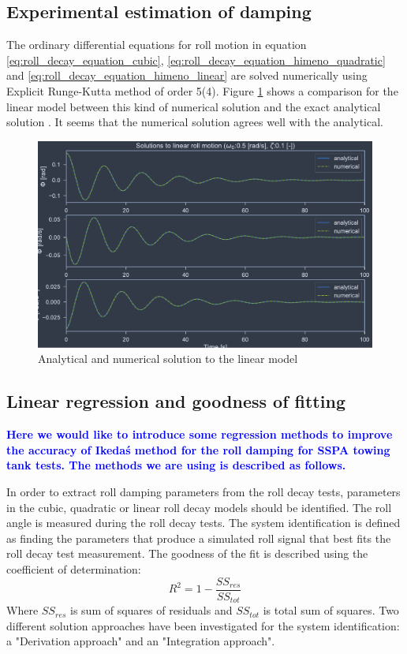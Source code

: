 \subsection{Experimental estimation of damping}
\label{se:experimental_estimation}

The ordinary differential equations for roll motion in equation \ref{eq:roll_decay_equation_cubic}, \ref{eq:roll_decay_equation_himeno_quadratic} and
\ref{eq:roll_decay_equation_himeno_linear} are solved numerically using Explicit Runge-Kutta method of order 5(4). Figure \ref{fig:analytical} shows a comparison for the linear model between this kind of numerical solution and the exact analytical solution \cite{henry_peter_piehl_ship_nodate}. It seems that the numerical solution agrees well with the analytical. 

\begin{figure}[h]
    \centering
    \includegraphics[width=\columnwidth]{figures/analytical.pdf}
    \caption{Analytical and numerical solution to the linear model}
    \label{fig:analytical}
\end{figure}

\subsection{Linear regression and goodness of fitting}
\textcolor{blue}{\textbf{Here we would like to introduce some regression methods to improve the accuracy of Ikeda\'s method for the roll damping for SSPA towing tank tests. The methods we are using is described as follows.}}

In order to extract roll damping parameters from the roll decay tests, parameters in the cubic, quadratic or linear roll decay models should be identified. The roll angle is measured during the roll decay tests. The system identification is defined as finding the parameters that produce a simulated roll signal that best fits the roll decay test measurement. The goodness of the fit is described using the coefficient of determination:
\begin{equation} \label{eq:R2}
R^2=1-\frac{SS_{res}}{SS_{tot}}
\end{equation}
Where $SS_{res}$ is sum of squares of residuals and $SS_{tot}$ is total sum of squares. Two different solution approaches have been investigated for the system identification: a "Derivation approach" and an "Integration approach". 

